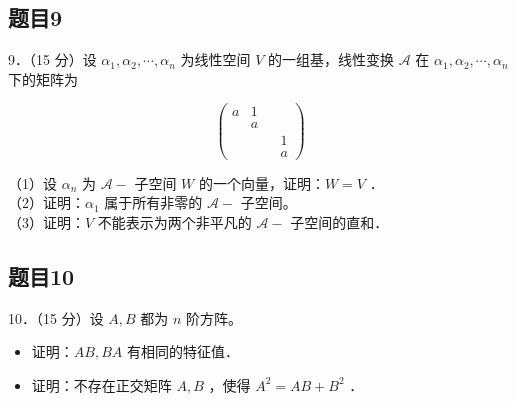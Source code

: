 \documentclass{article}
\begin{document}
\subsection{题目9}
9．（15 分）设 \(\alpha_{1}, \alpha_{2}, \cdots, \alpha_{n}\) 为线性空间 \(V\) 的一组基，线性变换 \(\mathcal{A}\) 在 \(\alpha_{1}, \alpha_{2}, \cdots, \alpha_{n}\) 下的矩阵为

\[
\left(\begin{array}{cccc}
a & 1 & & \\
& a & & \\
& & & 1 \\
& & & a
\end{array}\right)
\]

（1）设 \(\alpha_{n}\) 为 \(\mathcal{A}-\) 子空间 \(W\) 的一个向量，证明：\(W=V\) ．\\
（2）证明：\(\alpha_{1}\) 属于所有非零的 \(\mathcal{A}-\) 子空间。\\
（3）证明：\(V\) 不能表示为两个非平凡的 \(\mathcal{A}-\) 子空间的直和．

\subsection{题目10}
10．（15 分）设 \(A, B\) 都为 \(n\) 阶方阵。

\begin{itemize}
  \item[（1）] 证明：\(A B, B A\) 有相同的特征值．
  \item[（2）] 证明：不存在正交矩阵 \(A, B\) ，使得 \(A^{2}=A B+B^{2}\) ．
\end{itemize}
\end{document}
